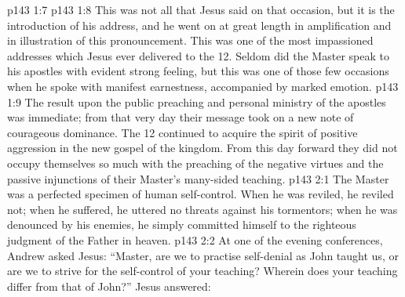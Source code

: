 \vs p143 1:7 
\vs p143 1:8 \pc This was not all that Jesus said on that occasion, but it is the introduction of his address, and he went on at great length in amplification and in illustration of this pronouncement. This was one of the most impassioned addresses which Jesus ever delivered to the 12. Seldom did the Master speak to his apostles with evident strong feeling, but this was one of those few occasions when he spoke with manifest earnestness, accompanied by marked emotion.
\vs p143 1:9 \pc The result upon the public preaching and personal ministry of the apostles was immediate; from that very day their message took on a new note of courageous dominance. The 12 continued to acquire the spirit of positive aggression in the new gospel of the kingdom. From this day forward they did not occupy themselves so much with the preaching of the negative virtues and the passive injunctions of their Master’s many\hyp{}sided teaching.
\vs p143 2:1 The Master was a perfected specimen of human self\hyp{}control. When he was reviled, he reviled not; when he suffered, he uttered no threats against his tormentors; when he was denounced by his enemies, he simply committed himself to the righteous judgment of the Father in heaven.
\vs p143 2:2 \pc At one of the evening conferences, Andrew asked Jesus: “Master, are we to practise self\hyp{}denial as John taught us, or are we to strive for the self\hyp{}control of your teaching? Wherein does your teaching differ from that of John?” Jesus answered: 
